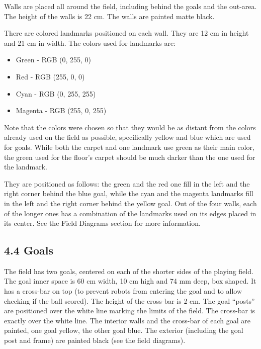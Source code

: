 \documentclass{article}
\begin{document}
Walls are placed all around the field, including behind the goals and the out-area. The height of the walls is \textcolor{color-5}{22} cm. The walls are painted matte black.

\textcolor{color-5}{There are colored landmarks positioned on each wall. They are 12 cm in height and 21 cm in width. The colors used for landmarks are:}

\begin{itemize}
\item \textcolor{color-5}{Green - RGB (0, 255, 0)}

\item \textcolor{color-5}{Red - RGB (255, 0, 0)}

\item \textcolor{color-5}{Cyan - RGB (0, 255, 255)}

\item \textcolor{color-5}{Magenta - RGB (255, 0, 255)}

\end{itemize}
\textcolor{color-5}{Note that the colors were chosen so that they would be as distant from the colors already used on the field as possible, specifically yellow and blue which are used for goals. While both the carpet and one landmark use green as their main color, the green used for the floor's carpet should be much darker than the one used for the landmark.}

\textcolor{color-5}{They are positioned as follows: the green and the red one fill in the left and the right corner behind the blue goal, while the cyan and the magenta landmarks fill in the left and the right corner behind the yellow goal. Out of the four walls, each of the longer ones has a combination of the landmarks used on its edges placed in its center. See the Field Diagrams section for more information.}

\subsection{4.4 Goals \label{ref-032}}

The field has two goals, centered on each of the shorter sides of the playing field. The goal inner space is 60 cm width, 10 cm high and 74 mm deep, box shaped. It has a cross-bar on top (to prevent robots from entering the goal and to allow checking if the ball scored). \textcolor{color-5}{The height of the cross-bar is 2 cm.} The goal ``posts'' are positioned over the white line marking the limits of the field. The cross-bar is exactly over the white line. The interior walls and the cross-bar of each goal are painted, one goal yellow, the other goal blue. The exterior (including the goal post and frame) are painted black (see the field diagrams). 
\end{document}
